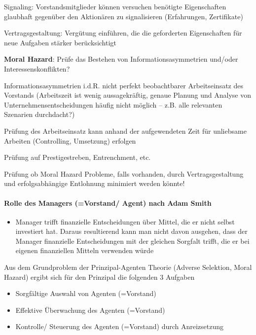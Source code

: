 \documentclass[
]{article}
\providecommand{\tightlist}{%
  \setlength{\itemsep}{0pt}\setlength{\parskip}{0pt}}
\begin{document}
Signaling: Vorstandsmitglieder können versuchen benötigte Eigenschaften
glaubhaft gegenüber den Aktionären zu signalisieren (Erfahrungen,
Zertifikate)

Vertragsgestaltung: Vergütung einführen, die die geforderten
Eigenschaften für neue Aufgaben stärker berücksichtigt

\textbf{Moral Hazard}: Prüfe das Bestehen von Informationsasymmetrien
und/oder Interessenskonflikten?

Informationsasymmetrien i.d.R. nicht perfekt beobachtbarer
Arbeitseinsatz des Vorstands (Arbeitszeit ist wenig aussagekräftig,
genaue Planung und Analyse von Unternehmensentscheidungen häufig nicht
möglich -- z.B. alle relevanten Szenarien durchdacht?)

Prüfung des Arbeitseinsatz kann anhand der aufgewendeten Zeit für
unliebsame Arbeiten (Controlling, Umsetzung) erfolgen

Prüfung auf Prestigestreben, Entrenchment, etc.

Prüfung ob Moral Hazard Probleme, falls vorhanden, durch
Vertragsgestaltung und erfolgsabhängige Entlohnung minimiert werden
könnte!

\hypertarget{rolle-des-managers-vorstand-agent-nach-adam-smith}{%
\paragraph{Rolle des Managers (=Vorstand/ Agent) nach Adam
Smith}\label{rolle-des-managers-vorstand-agent-nach-adam-smith}}

\begin{itemize}
\tightlist
\item
  Manager trifft finanzielle Entscheidungen über Mittel, die er nicht
  selbst investiert hat. Daraus resultierend kann man nicht davon
  ausgehen, dass der Manager finanzielle Entscheidungen mit der gleichen
  Sorgfalt trifft, die er bei eigenen finanziellen Mitteln verwenden
  würde
\end{itemize}

Aus dem Grundproblem der Prinzipal-Agenten Theorie (Adverse Selektion,
Moral Hazard) ergibt sich für den Prinzipal die folgenden 3 Aufgaben

\begin{itemize}
\tightlist
\item
  Sorgfältige Auswahl von Agenten (=Vorstand)
\item
  Effektive Überwachung des Agenten (=Vorstand)
\item
  Kontrolle/ Steuerung des Agenten (=Vorstand) durch Anreizsetzung
\end{itemize}
\end{document}
